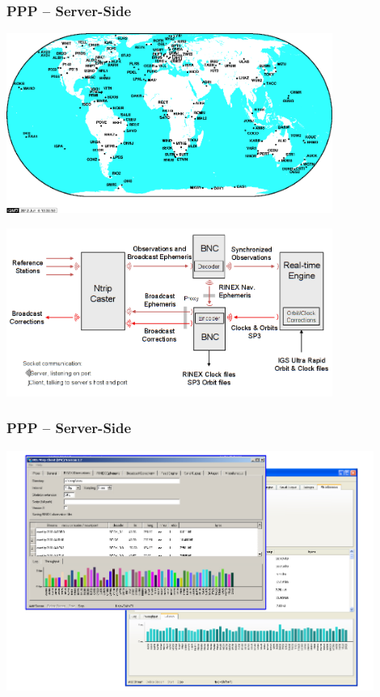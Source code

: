 \documentclass[10pt]{beamer}
\begin{document}

\begin{frame}
\frametitle{PPP -- Server-Side}

\includegraphics[width=0.8\textwidth,angle=0]{igs_map.png}

\vspace*{-2cm}

\hspace*{2cm}
\includegraphics[width=0.8\textwidth,angle=0]{bnc_rtnet_flow.png}

\end{frame}


\begin{frame}
\frametitle{PPP -- Server-Side}
  \begin{center}
    \includegraphics[width=0.9\textwidth,angle=0]{bnc_feed.png}
  \end{center}
\end{frame}
\end{document}
